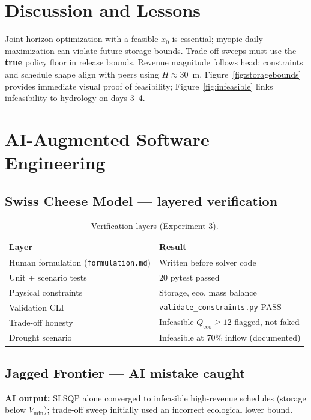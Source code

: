 \documentclass[11pt,a4paper]{article}
\begin{document}
\section{Discussion and Lessons}

Joint horizon optimization with a feasible $x_0$ is essential; myopic daily maximization can violate future storage bounds. Trade-off sweeps must use the \textbf{true} policy floor in release bounds. Revenue magnitude follows head; constraints and schedule shape align with peers using $H\approx 30$~m. Figure~\ref{fig:storagebounds} provides immediate visual proof of feasibility; Figure~\ref{fig:infeasible} links infeasibility to hydrology on days 3--4.

\section{AI-Augmented Software Engineering}
\label{sec:ai-eng}

\subsection{Swiss Cheese Model --- layered verification}
\begin{table}[htbp]
  \centering
  \caption{Verification layers (Experiment 3).}
  \label{tab:swiss3}
  \begin{tabular}{@{}ll@{}}
    \toprule
    Layer & Result \\
    \midrule
    Human formulation (\texttt{formulation.md}) & Written before solver code \\
    Unit + scenario tests & 20 pytest passed \\
    Physical constraints & Storage, eco, mass balance \\
    Validation CLI & \texttt{validate\_constraints.py} PASS \\
    Trade-off honesty & Infeasible $Q_{\mathrm{eco}}\ge 12$ flagged, not faked \\
    Drought scenario & Infeasible at 70\% inflow (documented) \\
    \bottomrule
  \end{tabular}
\end{table}

\subsection{Jagged Frontier --- AI mistake caught}
\textbf{AI output:} SLSQP alone converged to infeasible high-revenue schedules (storage below $V_{\min}$); trade-off sweep initially used an incorrect ecological lower bound.
\end{document}
